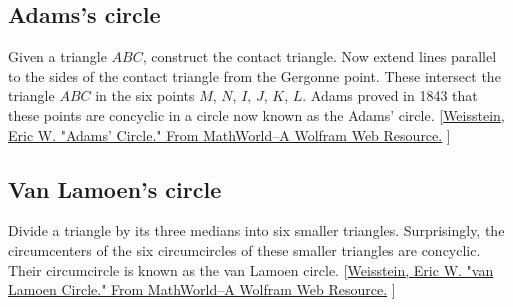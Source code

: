 
\subsection{Adams's circle} %
\label{sub:adams_circle}

Given a triangle $ABC$, construct the contact triangle. Now extend lines parallel to the sides of the contact triangle from the Gergonne point. These intersect the triangle $ABC$ in the six points $M$, $N$, $I$, $J$, $K$, $L$. Adams proved in 1843 that these points are concyclic in a circle now known as the Adams' circle.
[\href{https://mathworld.wolfram.com/AdamsCircle.html}{Weisstein, Eric W. "Adams' Circle." From MathWorld--A Wolfram Web Resource.}
]
\begin{tkzexample}
  \begin{center}
  \end{center}
\end{tkzexample}


\subsection{Van Lamoen's circle} %
\label{sub:van_lamoen_s_circle}

Divide a triangle by its three medians into six smaller triangles. Surprisingly, the circumcenters  of the six circumcircles of these smaller triangles  are concyclic. Their circumcircle  is known as the van Lamoen circle.
 [\href{https://mathworld.wolfram.com/vanLamoenCircle.html}{Weisstein, Eric W. "van Lamoen Circle." From MathWorld--A Wolfram Web Resource.} ]

